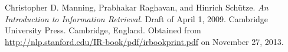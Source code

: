 \begin{thebibliography}{9} %


Christopher D. Manning, Prabhakar Raghavan, and Hinrich Sch\"utze. \emph{An
Introduction to Information Retrieval}. Draft of April 1, 2009. Cambridge
University Press. Cambridge, England.  Obtained from
\url{http://nlp.stanford.edu/IR-book/pdf/irbookprint.pdf} on November 27, 2013.

\end{thebibliography}

